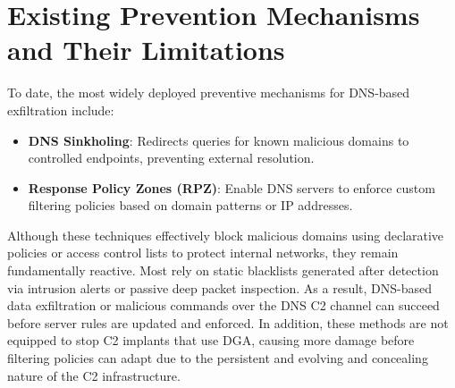 \documentclass [11pt, proquest] {uwthesis}[2020/02/24]
\begin{document}
\section{Existing Prevention Mechanisms and Their Limitations}
To date, the most widely deployed preventive mechanisms for DNS-based exfiltration include:
\begin{itemize}
\item \textbf{DNS Sinkholing}: Redirects queries for known malicious domains to controlled endpoints, preventing external resolution.
\item \textbf{Response Policy Zones (RPZ)}: Enable DNS servers to enforce custom filtering policies based on domain patterns or IP addresses.
\end{itemize}
Although these techniques effectively block malicious domains using declarative policies or access control lists to protect internal networks, they remain fundamentally reactive. Most rely on static blacklists generated after detection via intrusion alerts or passive deep packet inspection. As a result, DNS-based data exfiltration or malicious commands over the DNS C2 channel can succeed before server rules are updated and enforced. In addition, these methods are not equipped to stop C2 implants that use DGA, causing more damage before filtering policies can adapt due to the persistent and evolving and concealing nature of the C2 infrastructure.


\end{document}
